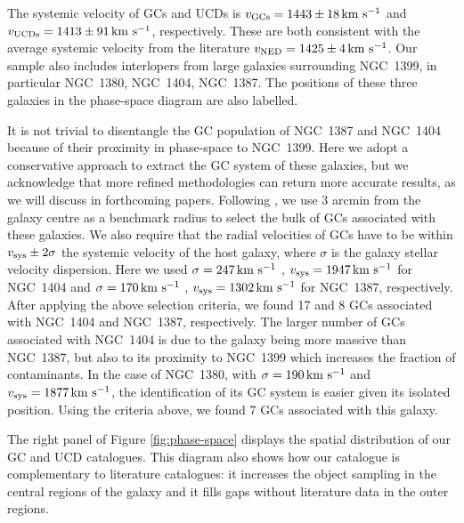 \documentclass[useAMS,usenatbib]{mn2e}
\newcommand{\kms}{\mbox{\,km~s$^{-1}$}}
\begin{document}
The systemic velocity of GCs and UCDs is $v_{\rm GCs} = 1443 \pm 18 \kms$ and 
$v_{\rm UCDs} = 1413 \pm 91 \kms$, respectively. These are both consistent with 
the average systemic velocity from the literature $v_{\rm NED} = 1425 \pm 4 
\kms$. Our sample also includes interlopers from large galaxies surrounding 
NGC~1399, in particular NGC~1380, NGC~1404, NGC~1387. The positions of these 
three galaxies in the phase-space diagram are also labelled. 

It is not trivial to disentangle the GC population of NGC~1387 and NGC~1404 
because of their proximity in phase-space to NGC~1399. 
Here we adopt a conservative approach to extract the GC system of these 
galaxies, but we acknowledge that more refined methodologies can return more 
accurate results, as we will discuss in forthcoming papers.
Following \citet{Schuberth}, we use 3 arcmin from the galaxy 
centre as a benchmark radius to select the bulk of GCs associated with these 
galaxies. We also require that the radial velocities of GCs have to be within 
$v_{\rm sys} \pm 2\sigma$  the systemic velocity of the host galaxy, where 
$\sigma$ is the galaxy stellar velocity dispersion. Here we used $\sigma = 247 
\kms$  \citep{Vanderbeke11}, $v_{\rm sys} = 1947 \kms$ for NGC~1404 and $\sigma 
= 170 \kms$ \citep{Wegner03}, $v_{\rm sys} = 1302\kms $ for NGC~1387, 
respectively. 
After applying the above selection criteria, we found 17 and 8 
GCs associated with NGC~1404 and NGC~1387, respectively. 
The larger number of 
GCs associated with NGC~1404 is due to the galaxy being more massive than 
NGC~1387, but also to its proximity to NGC~1399 which increases the fraction of 
contaminants.
In the case of NGC~1380, with $\sigma = 190 \kms$  \citep{Vanderbeke11} and 
$v_{\rm sys} = 1877 \kms$, the identification of its GC system is easier given 
its isolated position. Using the criteria above, we found 7 GCs associated with 
this galaxy.

The right panel of Figure \ref{fig:phase-space} displays the spatial 
distribution of our GC and UCD catalogues. This diagram also shows how our 
catalogue is complementary to literature catalogues: it increases the object 
sampling in the central regions of the galaxy and it fills gaps without literature data in 
the outer regions. 
\end{document}
